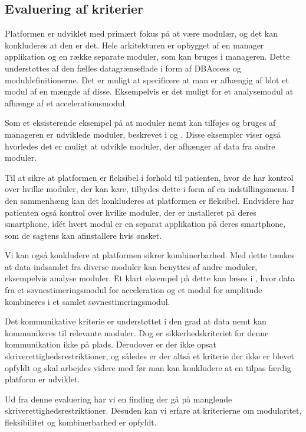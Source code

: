 \subsection{Evaluering af kriterier}
\begin{description}[style=nextline]
	\item[Modulær]
	Platformen er udviklet med primært fokus på at være modulær, og det kan konkluderes at den er det.
	Hele arkitekturen er opbygget af en manager applikation og en række separate moduler, som kan bruges i manageren.
	Dette understøttes af den fælles datagrænseflade i form af DBAccess og moduldefinitionerne.  
	Det er muligt at specificere at man er afhængig af blot et modul af en mængde af disse.
	Eksempelvis er det muligt for et analysemodul at afhænge af et accelerationsmodul.
	
	Som et eksisterende eksempel på at moduler nemt kan tilføjes og bruges af manageren er udviklede moduler, beskrevet i \citet{misc:soevnrapp} og \citet{misc:surveyrapp}.
	Disse eksempler viser også hvorledes det er muligt at udvikle moduler, der afhænger af data fra andre moduler.
	
	\item[Fleksibilitet]
	Til at sikre at platformen er fleksibel i forhold til patienten, hvor de har kontrol over hvilke moduler, der kan køre, tilbydes dette i form af en indstillingsmenu.
	I den sammenhæng kan det konkluderes at platformen er fleksibel.
	Endvidere har patienten også kontrol over hvilke moduler, der er installeret på deres smartphone, idét hvert modul er en separat applikation på deres smartphone, som de sagtens kan afinstallere hvis ønsket.
	
	\item[Kombinerbar]
	Vi kan også konkludere at platformen sikrer kombinerbarhed.
	Med dette tænkes at data indsamlet fra diverse moduler kan benyttes af andre moduler, eksempelvis analyse moduler.
	Et klart eksempel på dette kan læses i \citet{misc:soevnrapp}, hvor data fra et søvnestimeringsmodul for acceleration og et modul for amplitude kombineres i et samlet søvnestimeringsmodul.
	
	\item[Kommunikativ]
	Det kommunikative kriterie er understøttet i den grad at data nemt kan kommunikeres til relevante moduler.
	Dog er sikkerhedskriteriet for denne kommunikation ikke på plads.
	Derudover er der ikke opsat skriverettighedsrestriktioner, og således er der altså et kriterie der ikke er blevet opfyldt og skal arbejdes videre med før man kan konkludere at en tilpas færdig platform er udviklet.
\end{description}
Ud fra denne evaluering har vi en finding der gå på manglende skriverettighedsrestriktioner.
Desuden kan vi erfare at kriterierne om modularitet, fleksibilitet og kombinerbarhed er opfyldt.
